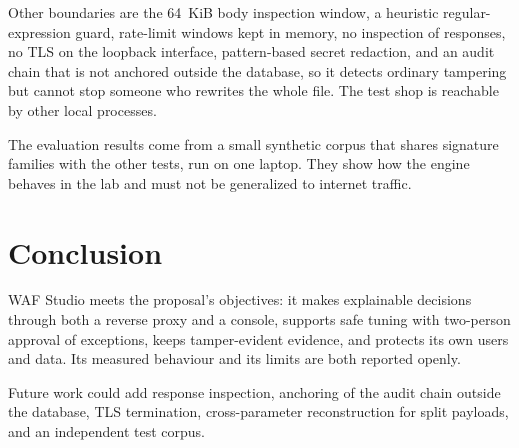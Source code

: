 \documentclass{FastFyp}
\begin{document}
Other boundaries are the 64~KiB body inspection window, a heuristic regular-expression guard, rate-limit windows kept in memory, no inspection of responses, no TLS on the loopback interface, pattern-based secret redaction, and an audit chain that is not anchored outside the database, so it detects ordinary tampering but cannot stop someone who rewrites the whole file. The test shop is reachable by other local processes.

The evaluation results come from a small synthetic corpus that shares signature families with the other tests, run on one laptop. They show how the engine behaves in the lab and must not be generalized to internet traffic.

\section{Conclusion}
WAF Studio meets the proposal's objectives: it makes explainable decisions through both a reverse proxy and a console, supports safe tuning with two-person approval of exceptions, keeps tamper-evident evidence, and protects its own users and data. Its measured behaviour and its limits are both reported openly.

Future work could add response inspection, anchoring of the audit chain outside the database, TLS termination, cross-parameter reconstruction for split payloads, and an independent test corpus.
\end{document}
